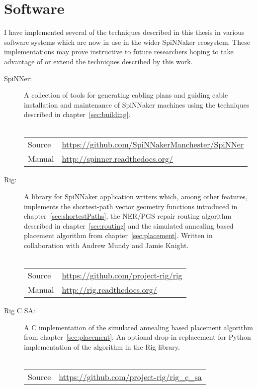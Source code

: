 \chapter{Software}
	\label{sec:software}
	
	I have implemented several of the techniques described in this thesis
	in various software systems which are now in use in the wider SpiNNaker
	ecosystem. These implementations may prove instructive to future researchers
	hoping to take advantage of or extend the techniques described by this work.
	
	\begin{description}
		
		\item [SpiNNer:] A collection of tools for generating cabling plans and
		guiding cable installation and maintenance of SpiNNaker machines using the
		techniques described in chapter~\ref{sec:building}.
		\\
		\vspace*{-1.25em}
		\\
		\begin{tabular}{ll}
			Source & \url{https://github.com/SpiNNakerManchester/SpiNNer} \\
			Manual & \url{http://spinner.readthedocs.org/} \\
		\end{tabular}
		
		\item [Rig:] A library for SpiNNaker application writers which, among other
		features, implements the shortest-path vector geometry functions introduced
		in chapter~\ref{sec:shortestPaths}, the NER/PGS repair routing algorithm
		described in chapter~\ref{sec:routing} and the simulated annealing based
		placement algorithm from chapter~\ref{sec:placement}. Written in
		collaboration with Andrew Mundy and Jamie Knight.
		\\
		\vspace*{-1.25em}
		\\
		\begin{tabular}{ll}
			Source & \url{https://github.com/project-rig/rig} \\
			Manual & \url{http://rig.readthedocs.org/} \\
		\end{tabular}
		
		\item [Rig C SA:] A C implementation of the simulated annealing based
		placement algorithm from chapter~\ref{sec:placement}. An optional drop-in
		replacement for Python implementation of the algorithm in the Rig library.
		\\
		\vspace*{-1.25em}
		\\
		\begin{tabular}{ll}
			Source & \url{https://github.com/project-rig/rig_c_sa} \\
		\end{tabular}
		

\end{description}

